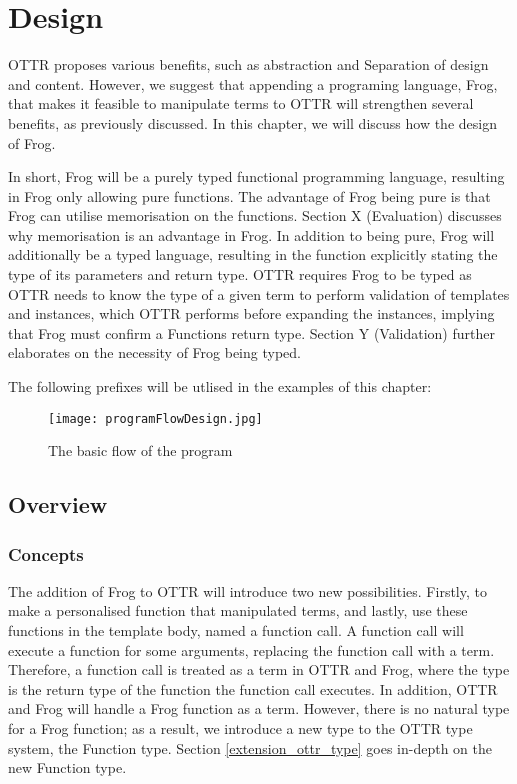 
\chapter{Design} %
OTTR proposes various benefits, such as abstraction and Separation of design and content. However, we suggest that appending a programing language, Frog, that makes it feasible to manipulate terms to OTTR will strengthen several benefits, as previously discussed.  In this chapter, we will discuss how the design of Frog.

\para 
In short, Frog will be a purely typed functional programming language, resulting in Frog only allowing pure functions. The advantage of Frog being pure is that Frog can utilise memorisation on the functions. Section X (Evaluation) discusses why memorisation is an advantage in Frog. In addition to being pure, Frog will additionally be a typed language, resulting in the function explicitly stating the type of its parameters and return type. OTTR requires Frog to be typed as OTTR needs to know the type of a given term to perform validation of templates and instances, which OTTR performs before expanding the instances, implying that Frog must confirm a Functions return type. Section Y (Validation) further elaborates on the necessity of Frog being typed. 

\para
The following prefixes will be utlised in the examples of this chapter:



\begin{figure}[h]
    \centering
    \texttt{[image: programFlowDesign.jpg]}
    \caption{The basic flow of the program}
    \label{fig:basic_program_flow}
\end{figure}

\section{Overview}

\subsection{Concepts}
The addition of Frog to OTTR will introduce two new possibilities. Firstly, to make a personalised function that manipulated terms, and lastly, use these functions in the template body, named a function call. A function call will execute a function for some arguments, replacing the function call with a term. Therefore, a function call is treated as a term in OTTR and Frog, where the type is the return type of the function the function call executes. In addition, OTTR and Frog will handle a Frog function as a term. However, there is no natural type for a Frog function; as a result, we introduce a new type to the OTTR type system, the Function type. Section \ref{extension_ottr_type} goes in-depth on the new Function type. 


